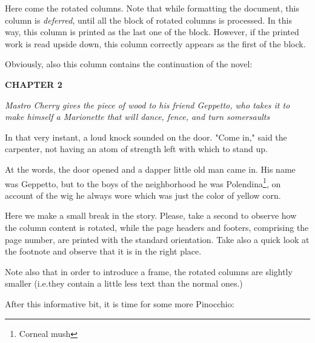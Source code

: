 \documentclass[12pt,twoside,twocolumn]{article}
\begin{document}
\rotboxpages%
Here come the rotated columns. Note that while formatting the
document, this column is \emph{deferred}, until all the block of rotated
columns is processed. In this way, this column is printed as the last one
of the block. However, if the printed work is read upside down, this
column correctly appears as the first of the block.

Obviously, also this column contains the continuation of the novel:

\bigskip
{\slshape%

  \textbf{CHAPTER 2}

  \emph{Mastro Cherry gives the piece of wood to his friend Geppetto,
    who takes it to make himself a Marionette that will dance,
    fence, and turn somersaults}
  \medskip

  In that very instant, a loud knock sounded on the door.
  "Come in," said the carpenter, not having an atom of
  strength left with which to stand up.

  At the words, the door opened and a dapper little old man came in.
  His name was Geppetto, but to the boys of the neighborhood he was
  Polendina\footnote{Corneal mush}, on account of the wig he always
  wore which was just the color of yellow corn.

}

\bigbreak

Here we make a small break in the story. Please, take a second to
observe how the column content is rotated, while the page headers and
footers, comprising the page number, are printed with the standard
orientation. Take also a quick look at the footnote and observe that
it is in the right place.

Note also that in order to introduce a frame, the rotated columns are
slightly smaller (i.e.\@ they contain a little less text than the
normal ones.)

After this informative bit, it is time for some more Pinocchio:
\end{document}
